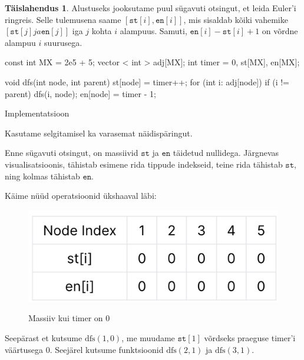 \documentclass{trkut}
\theoremstyle{definition}
\newtheorem*{solution}{Täislahendus}
\begin{document}
\begin{solution}
Alustuseks jooksutame puul sügavuti otsingut, et leida Euler'i ringreis.
Selle tulemusena saame $[\texttt{st}[i], \texttt{en}[i]]$, mis sisaldab kõiki vahemike $[\texttt{st}[j] ja \texttt{en}[j]]$ iga $j$ kohta $i$ alampuus. Samuti, $\texttt{en}[i]-\texttt{st}[i]+1$ on võrdne alampuu $i$ suurusega.
\begin{cclol}
const int MX = 2e5 + 5;
vector < int > adj[MX];
int timer = 0, st[MX], en[MX];

void dfs(int node, int parent) {
  st[node] = timer++;
  for (int i: adj[node]) {
    if (i != parent) {
      dfs(i, node);
    }
  }
  en[node] = timer - 1;
}
\end{cclol}
\begin{kk}[H]%
    \caption{Implementatsioon}%
    \label{EMaxx}%
    \end{kk}
    
Kasutame selgitamisel ka varasemat näidispäringut.

Enne sügavuti otsingut, on massiivid $\texttt{st}$ ja $\texttt{en}$ täidetud nullidega. 
Järgnevas visualisatsioonis, tähistab esimene rida tippude indekseid, teine rida tähistab $\texttt{st}$, ning kolmas tähistab $\texttt{en}$.

Käime nüüd operatsioonid ükshaaval läbi:

\begin{figure}[H]%
    \includegraphics[width=12cm]{first.jpeg}%
    \caption{Massiiv kui timer on 0}%
    \label{joonis}%
\end{figure}

Seepärast et kutsume $\text{dfs}(1, 0)$, me muudame $\texttt{st}[1]$ võrdseks praeguse timer'i väärtusega $0$. Seejärel kutsume funktsioonid $\text{dfs}(2, 1)$ ja
$\text{dfs}(3, 1)$.


\end{solution}
\end{document}

